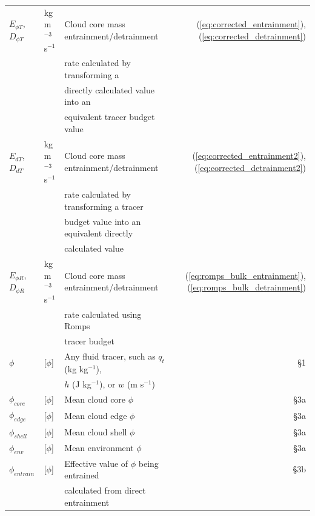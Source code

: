 \documentclass[12pt]{article}
\begin{document}
\begin{appendix}
\begin{table}[t]
\begin{center}
\begin{tabular}{lllr}
 $E_{\phi T}$, $D_{\phi T}$
    & kg m$^{-3}$ s$^{-1}$ 
    & Cloud core mass entrainment/detrainment  
    &  (\ref{eq:corrected_entrainment}), (\ref{eq:corrected_detrainment}) \\
   && rate calculated by transforming a   & \\
   && directly calculated value into an  & \\
   && equivalent tracer budget value & \\
     
 $E_{d T}$, $D_{d T}$
    & kg m$^{-3}$ s$^{-1}$ 
    & Cloud core mass entrainment/detrainment 
    &  (\ref{eq:corrected_entrainment2}), (\ref{eq:corrected_detrainment2}) \\
   && rate calculated by transforming a tracer & \\
   && budget value into an equivalent directly  & \\
   && calculated value & \\

 $E_{\phi R}$, $D_{\phi R}$     
    & kg m$^{-3}$ s$^{-1}$ 
    & Cloud core mass entrainment/detrainment
    &  (\ref{eq:romps_bulk_entrainment}), (\ref{eq:romps_bulk_detrainment}) \\
   && rate calculated using Romps & \\
   && tracer budget & \\

 $\phi$    
    & [$\phi$]            
    & Any fluid tracer, such as $q_t$ (kg kg$^{-1}$), 
    & \S 1 \\
   && $h$ (J kg$^{-1}$), or $w$ (m s$^{-1}$) & \\

 $\phi_{core}$    
    & [$\phi$]            
    & Mean cloud core $\phi$
    & \S 3a \\

 $\phi_{edge}$    
    & [$\phi$]            
    & Mean cloud edge $\phi$
    & \S 3a \\

 $\phi_{shell}$   
    & [$\phi$]            
    & Mean cloud shell $\phi$
    & \S 3a \\

 $\phi_{env}$     
    & [$\phi$]            
    & Mean environment $\phi$
    & \S 3a \\

 $\phi_{entrain}$ 
    & [$\phi$]            
    & Effective value of $\phi$ being entrained
    & \S 3b \\
   && calculated from direct entrainment& \\


\end{tabular}
\end{center}
\end{table}
\end{appendix}
\end{document}
